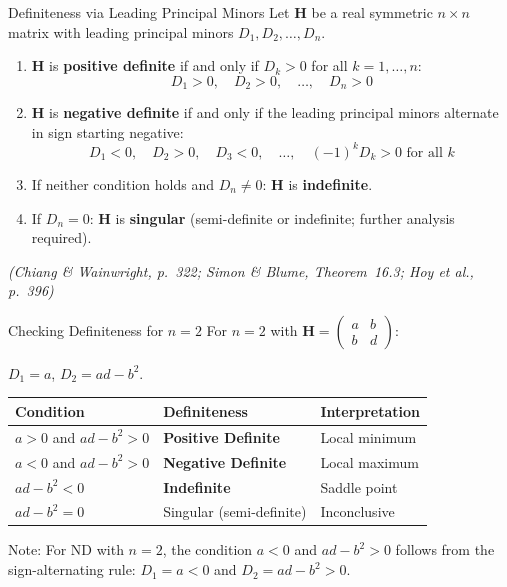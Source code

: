 \documentclass[12pt, a4paper]{article}
\theoremstyle{definition}
\newcommand{\bH}{\mathbf{H}}
\begin{document}
\begin{thmbox}{Definiteness via Leading Principal Minors}
Let $\bH$ be a real symmetric $n \times n$ matrix with leading principal
minors $D_1, D_2, \ldots, D_n$.
\begin{enumerate}
  \item $\bH$ is \textbf{positive definite} if and only if
        $D_k > 0$ for all $k = 1, \ldots, n$:
        \[
          D_1 > 0,\quad D_2 > 0,\quad \ldots,\quad D_n > 0
        \]
  \item $\bH$ is \textbf{negative definite} if and only if
        the leading principal minors alternate in sign starting negative:
        \[
          D_1 < 0,\quad D_2 > 0,\quad D_3 < 0,\quad \ldots,\quad
          (-1)^k D_k > 0 \text{ for all } k
        \]
  \item If neither condition holds and $D_n \neq 0$: $\bH$ is
        \textbf{indefinite}.
  \item If $D_n = 0$: $\bH$ is \textbf{singular} (semi-definite or
        indefinite; further analysis required).
\end{enumerate}
\emph{(Chiang \& Wainwright, p.\ 322; Simon \& Blume, Theorem~16.3;
Hoy et al., p.\ 396)}
\end{thmbox}

\begin{exbox}{Checking Definiteness for $n=2$}
For $n=2$ with $\bH = \begin{pmatrix} a & b \\ b & d \end{pmatrix}$:

$D_1 = a$, \quad $D_2 = ad - b^2$.

\begin{center}
\begin{tabular}{lll}
  \toprule
  \rowcolor{tabhead}
  \color{white}Condition & \color{white}Definiteness & \color{white}Interpretation \\
  \midrule
  $a > 0$ and $ad - b^2 > 0$
    & \textbf{Positive Definite} & Local minimum \\
  \rowcolor{tabeven}
  $a < 0$ and $ad - b^2 > 0$
    & \textbf{Negative Definite} & Local maximum \\
  $ad - b^2 < 0$
    & \textbf{Indefinite} & Saddle point \\
  \rowcolor{tabeven}
  $ad - b^2 = 0$
    & Singular (semi-definite) & Inconclusive \\
  \bottomrule
\end{tabular}
\end{center}

Note: For ND with $n=2$, the condition $a < 0$ and $ad-b^2 > 0$ follows
from the sign-alternating rule: $D_1 = a < 0$ and $D_2 = ad-b^2 > 0$.
\end{exbox}
\end{document}
